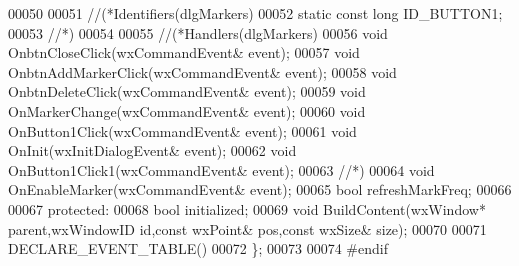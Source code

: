 \begin{DoxyCode}
00050 
00051         \textcolor{comment}{//(*Identifiers(dlgMarkers)}
00052         \textcolor{keyword}{static} \textcolor{keyword}{const} \textcolor{keywordtype}{long} ID_BUTTON1;
00053         \textcolor{comment}{//*)}
00054 
00055         \textcolor{comment}{//(*Handlers(dlgMarkers)}
00056         \textcolor{keywordtype}{void} OnbtnCloseClick(wxCommandEvent& event);
00057         \textcolor{keywordtype}{void} OnbtnAddMarkerClick(wxCommandEvent& event);
00058         \textcolor{keywordtype}{void} OnbtnDeleteClick(wxCommandEvent& event);
00059         \textcolor{keywordtype}{void} OnMarkerChange(wxCommandEvent& event);
00060         \textcolor{keywordtype}{void} OnButton1Click(wxCommandEvent& event);
00061         \textcolor{keywordtype}{void} OnInit(wxInitDialogEvent& event);
00062         \textcolor{keywordtype}{void} OnButton1Click1(wxCommandEvent& event);
00063         \textcolor{comment}{//*)}
00064         \textcolor{keywordtype}{void} OnEnableMarker(wxCommandEvent& event);
00065         \textcolor{keywordtype}{bool} refreshMarkFreq;
00066 
00067     \textcolor{keyword}{protected}:
00068         \textcolor{keywordtype}{bool} initialized;
00069         \textcolor{keywordtype}{void} BuildContent(wxWindow* parent,wxWindowID \textcolor{keywordtype}{id},\textcolor{keyword}{const} wxPoint& pos,\textcolor{keyword}{const} wxSize& 
      size);
00070 
00071         DECLARE\_EVENT\_TABLE()
00072 \};
00073 
00074 \textcolor{preprocessor}{#endif}
\end{DoxyCode}
